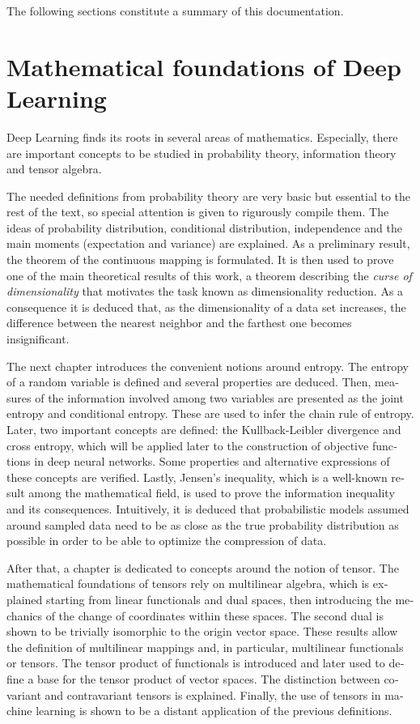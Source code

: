 \begin{otherlanguage}{american}
The following sections constitute a summary of this documentation.

\section*{Mathematical foundations of Deep Learning}

Deep Learning finds its roots in several areas of mathematics. Especially, there are important concepts to be studied in probability theory, information theory and tensor algebra.

The needed definitions from probability theory are very basic but essential to the rest of the text, so special attention is given to rigurously compile them. The ideas of probability distribution, conditional distribution, independence and the main moments (expectation and variance) are explained. As a preliminary result, the theorem of the continuous mapping is formulated. It is then used to prove one of the main theoretical results of this work, a theorem describing the \emph{curse of dimensionality} that motivates the task known as dimensionality reduction. As a consequence it is deduced that, as the dimensionality of a data set increases, the difference between the nearest neighbor and the farthest one becomes insignificant.

The next chapter introduces the convenient notions around entropy. The entropy of a random variable is defined and several properties are deduced. Then, measures of the information involved among two variables are presented as the joint entropy and conditional entropy. These are used to infer the chain rule of entropy. Later, two important concepts are defined: the Kullback-Leibler divergence and cross entropy, which will be applied later to the construction of objective functions in deep neural networks. Some properties and alternative expressions of these concepts are verified. Lastly, Jensen's inequality, which is a well-known result among the mathematical field, is used to prove the information inequality and its consequences. Intuitively, it is deduced that probabilistic models assumed around sampled data need to be as close as the true probability distribution as possible in order to be able to optimize the compression of data.

After that, a chapter is dedicated to concepts around the notion of tensor. The mathematical foundations of tensors rely on multilinear algebra, which is explained starting from linear functionals and dual spaces, then introducing the mechanics of the change of coordinates within these spaces. The second dual is shown to be trivially isomorphic to the origin vector space. These results allow the definition of multilinear mappings and, in particular, multilinear functionals or tensors. The tensor product of functionals is introduced and later used to define a base for the tensor product of vector spaces. The distinction between covariant and contravariant tensors is explained. Finally, the use of tensors in machine learning is shown to be a distant application of the previous definitions.


\end{otherlanguage}
